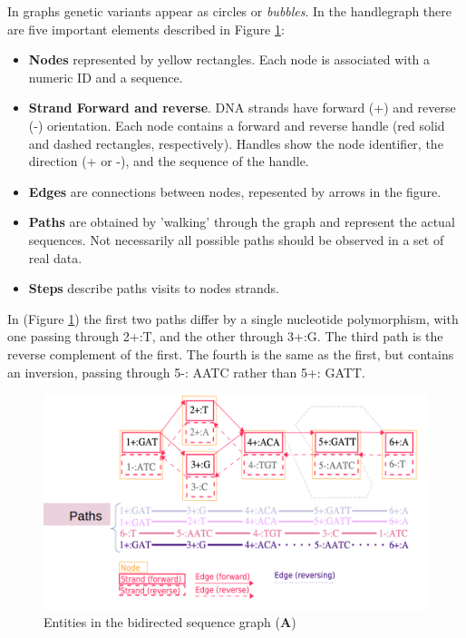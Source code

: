 In graphs genetic variants appear as circles or \textit{bubbles}. In the handlegraph there are five important elements described in Figure \ref{fig:gfa.png}:
\begin{itemize}
\item\textbf{Nodes} represented by yellow rectangles. Each node is associated with a numeric ID and a sequence. 

\item\textbf{Strand Forward and reverse}. DNA strands have forward (+) and reverse (-) orientation. Each node contains a forward and reverse handle (red solid and dashed rectangles, respectively). Handles show the node identifier, the direction (+ or -), and the sequence of the handle.

\item\textbf{Edges} are connections between nodes, repesented by arrows in the figure.

\item\textbf{Paths} are obtained by 'walking' through the graph and represent the actual sequences. Not necessarily all possible paths should be observed in a set of real data.

\item\textbf{Steps} describe paths visits to nodes strands.
\end{itemize}

In (Figure \ref{fig:gfa.png}) the first two paths differ by a single nucleotide polymorphism, with one passing through 2+:T, and the other through 3+:G. The third path is the reverse complement of the first. The fourth is the same as the first, but contains an inversion, passing through 5-: AATC rather than 5+: GATT.



\begin{figure}[H]
\centering
\includegraphics[width=1.00\textwidth]{fig/GFA.png}
\decoRule
\caption{Entities in the bidirected sequence graph (\textbf{A}) \cite{eizenga2020succinct}}
\label{fig:gfa.png}
\end{figure}

